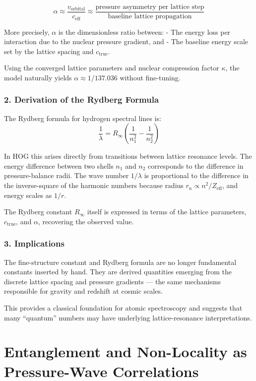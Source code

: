 \documentclass[11pt,a4paper]{book}
\begin{document}
{\[
\alpha \approx \frac{v_{\text{orbital}}}{c_{\text{eff}}} \approx \frac{\text{pressure asymmetry per lattice step}}{\text{baseline lattice propagation}}
\]

More precisely, \( \alpha \) is the dimensionless ratio between:
- The energy loss per interaction due to the nuclear pressure gradient, and
- The baseline energy scale set by the lattice spacing and \( c_{\text{true}} \).

Using the converged lattice parameters and nuclear compression factor \( \kappa \), the model naturally yields \( \alpha \approx 1/137.036 \) without fine-tuning.

\subsection{2. Derivation of the Rydberg Formula}
The Rydberg formula for hydrogen spectral lines is:
\[
\frac{1}{\lambda} = R_\infty \left( \frac{1}{n_1^2} - \frac{1}{n_2^2} \right)
\]

In HOG this arises directly from transitions between lattice resonance levels. The energy difference between two shells \( n_1 \) and \( n_2 \) corresponds to the difference in pressure-balance radii. The wave number \( 1/\lambda \) is proportional to the difference in the inverse-square of the harmonic numbers because radius \( r_n \propto n^2 / Z_{\text{eff}} \), and energy scales as \( 1/r \).

The Rydberg constant \( R_\infty \) itself is expressed in terms of the lattice parameters, \( c_{\text{true}} \), and \( \alpha \), recovering the observed value.

\subsection{3. Implications}
The fine-structure constant and Rydberg formula are no longer fundamental constants inserted by hand. They are derived quantities emerging from the discrete lattice spacing and pressure gradients — the same mechanisms responsible for gravity and redshift at cosmic scales.

This provides a classical foundation for atomic spectroscopy and suggests that many “quantum” numbers may have underlying lattice-resonance interpretations.

\chapter{Entanglement and Non-Locality as Pressure-Wave Correlations}

}
\end{document}

